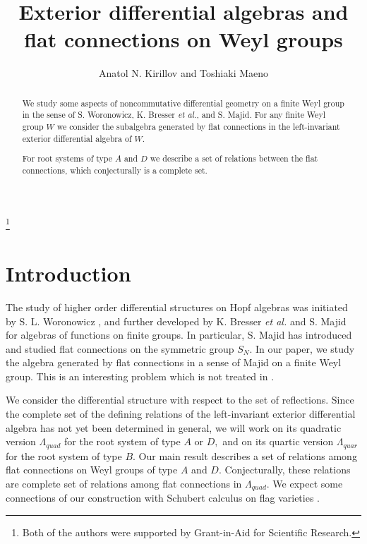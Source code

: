 
\setlength{\oddsidemargin}{0.2cm}
\setlength{\evensidemargin}{0.2cm}       
\textwidth=450pt
\textheight=650pt
\topmargin -10mm
%
\renewcommand{\thefootnote}{}
%
\newtheorem{thm}{Theorem}[section]
\newtheorem{dfn}{Definition}[section]
\newtheorem{prop}{Proposition}[section]
\newtheorem{lem}{Lemma}[section]
\newtheorem{rem}{Remark}[section]
\newtheorem{cor}{Corollary}[section]
\newtheorem{prob}{Problem}[section]
\newtheorem{conj}{Conjecture}[section]
\newtheorem{ex}{Example}[section]
\def\F{{\cal{F}}}
%
 
\title{Exterior differential algebras and flat connections on 
Weyl groups} 
\date{}
\author{Anatol N. Kirillov and Toshiaki Maeno}
\maketitle
\footnote{Both of the authors were 
supported by Grant-in-Aid for Scientific Research.}
\begin{abstract}
We study some aspects of noncommutative differential geometry 
on a finite Weyl group in the sense of S. Woronowicz, 
K. Bresser {\it et al.}, and S. Majid. For any finite Weyl 
group $W$ we consider the subalgebra generated 
by flat connections in the left-invariant exterior differential 
algebra of $W.$ 

For root systems of type $A$ and $D$ we describe 
a set of relations between the flat connections, which 
conjecturally is a complete set. 
\end{abstract}
\section*{Introduction}
The study of higher order differential structures on Hopf 
algebras was initiated by S. L. Woronowicz \cite{Wo}, and 
further developed by K. Bresser {\it et al.}\cite{BMDS} and 
S. Majid \cite{Maj} for algebras of functions on finite 
groups. In particular, S. Majid has introduced and studied 
flat connections on the symmetric group $S_N.$ In our paper, 
we study the algebra generated by flat connections in a sense 
of Majid on a finite Weyl group. This is an interesting problem 
which is not treated in \cite{Maj}. 

We consider the differential structure with respect to 
the set of reflections. 
Since the complete set of the defining relations of the 
left-invariant exterior differential algebra has 
not yet been determined in general, 
we will work on its quadratic version $\Lambda_{quad}$ for the 
root system of type $A$ or $D,$ and on its quartic version 
$\Lambda_{quar}$ for the root system of type $B.$ 
Our main result describes a set of relations among flat 
connections on Weyl groups of type $A$ and $D.$ 
Conjecturally, 
these relations are complete set of relations among flat 
connections in $\Lambda_{quad}.$ 
We expect some connections of our construction with 
Schubert calculus on flag varieties \cite{KM}. 
